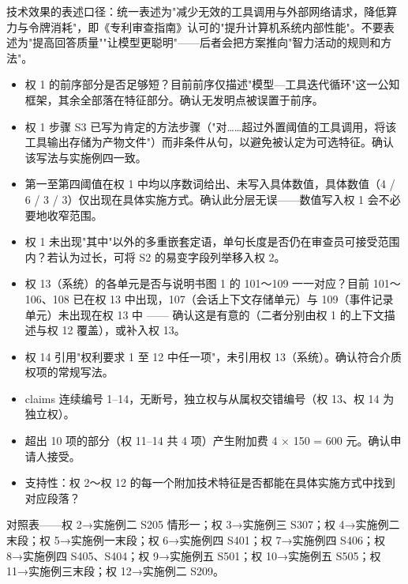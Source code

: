 \documentclass[11pt,UTF8]{ctexart}
\begin{document}
{\ntbf 技术效果的表述口径}：统一表述为"减少无效的工具调用与外部网络请求，降低算力与令牌消耗"，即《专利审查指南》认可的"提升计算机系统内部性能"。{\ntbf 不要}表述为"提高回答质量""让模型更聪明"——后者会把方案推向"智力活动的规则和方法"。


\begin{itemize}[label=\nbox]
  \item 权 1 的前序部分是否足够短？目前前序仅描述"模型—工具迭代循环"这一公知框架，其余全部落在特征部分。确认无发明点被误置于前序。
  \item 权 1 步骤 S3 已写为{\ntbf 肯定的方法步骤}（"对……超过外置阈值的工具调用，将该工具输出存储为产物文件"）而非条件从句，以避免被认定为可选特征。确认该写法与实施例四一致。
  \item 第一至第四阈值在权 1 中均以序数词给出、未写入具体数值，具体数值（4 / 6 / 3 / 3）仅出现在具体实施方式。确认此分层无误——数值写入权 1 会不必要地收窄范围。
  \item 权 1 未出现"其中"以外的多重嵌套定语，单句长度是否仍在审查员可接受范围内？若认为过长，可将 S2 的易变字段列举移入权 2。
  \item 权 13（系统）的各单元是否与说明书图 1 的 101～109 一一对应？目前 101～106、108 已在权 13 中出现，107（会话上下文存储单元）与 109（事件记录单元）未出现在权 13 中 —— 确认这是有意的（二者分别由权 1 的上下文描述与权 12 覆盖），或补入权 13。
  \item 权 14 引用"权利要求 1 至 12 中任一项"，未引用权 13（系统）。确认符合介质权项的常规写法。
  \item claims 连续编号 1–14，无断号，独立权与从属权交错编号（权 13、权 14 为独立权）。
  \item 超出 10 项的部分（权 11–14 共 4 项）产生附加费 4 × 150 = 600 元。确认申请人接受。
\end{itemize}


\begin{itemize}[label=\nbox]
  \item 支持性：权 2～权 12 的每一个附加技术特征是否都能在具体实施方式中找到对应段落？
\end{itemize}

对照表——权 2→实施例二 S205 情形一；权 3→实施例三 S307；权 4→实施例二末段；权 5→实施例一末段；权 6→实施例四 S401；权 7→实施例四 S406；权 8→实施例四 S405、S404；权 9→实施例五 S501；权 10→实施例五 S505；权 11→实施例三末段；权 12→实施例二 S209。
\end{document}

